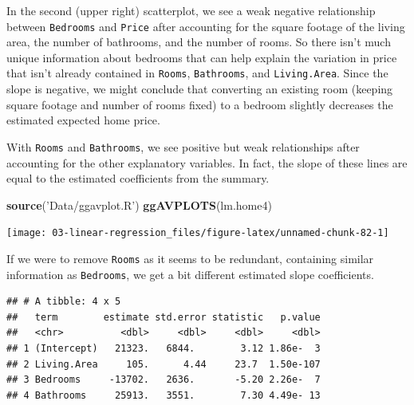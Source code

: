 \documentclass[
]{book}
\newenvironment{Shaded}{\begin{snugshade}}{\end{snugshade}}
\newcommand{\KeywordTok}[1]{\textcolor[rgb]{0.13,0.29,0.53}{\textbf{#1}}}
\newcommand{\NormalTok}[1]{#1}
\newcommand{\OperatorTok}[1]{\textcolor[rgb]{0.81,0.36,0.00}{\textbf{#1}}}
\newcommand{\StringTok}[1]{\textcolor[rgb]{0.31,0.60,0.02}{#1}}
\begin{document}
In the second (upper right) scatterplot, we see a weak negative relationship between \texttt{Bedrooms} and \texttt{Price} after accounting for the square footage of the living area, the number of bathrooms, and the number of rooms. So there isn't much unique information about bedrooms that can help explain the variation in price that isn't already contained in \texttt{Rooms}, \texttt{Bathrooms}, and \texttt{Living.Area}. Since the slope is negative, we might conclude that converting an existing room (keeping square footage and number of rooms fixed) to a bedroom slightly decreases the estimated expected home price.

With \texttt{Rooms} and \texttt{Bathrooms}, we see positive but weak relationships after accounting for the other explanatory variables. In fact, the slope of these lines are equal to the estimated coefficients from the summary.

\begin{Shaded}
\begin{Highlighting}[]
\KeywordTok{source}\NormalTok{(}\StringTok{'Data/ggavplot.R'}\NormalTok{)}
\KeywordTok{ggAVPLOTS}\NormalTok{(lm.home4)}
\end{Highlighting}
\end{Shaded}

\begin{center}\texttt{[image: 03-linear-regression\_files/figure-latex/unnamed-chunk-82-1]} \end{center}

If we were to remove \texttt{Rooms} as it seems to be redundant, containing similar information as \texttt{Bedrooms}, we get a bit different estimated slope coefficients.

\begin{Shaded}
\end{Shaded}

\begin{verbatim}
## # A tibble: 4 x 5
##   term        estimate std.error statistic   p.value
##   <chr>          <dbl>     <dbl>     <dbl>     <dbl>
## 1 (Intercept)   21323.   6844.        3.12 1.86e-  3
## 2 Living.Area     105.      4.44     23.7  1.50e-107
## 3 Bedrooms     -13702.   2636.       -5.20 2.26e-  7
## 4 Bathrooms     25913.   3551.        7.30 4.49e- 13
\end{verbatim}
\end{document}
